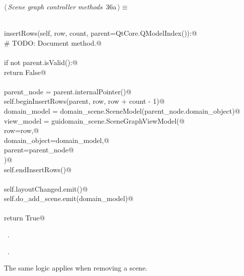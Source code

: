 \documentclass[
    a4paper,      %
    10pt,         %
    openright,    %
    notitlepage,  %
    parskip=half, %
]{scrreprt}       %
\theoremstyle{definition}                    %
\begin{document}
\begin{flushleft} \small
\begin{minipage}{\linewidth}\label{scrap42}\raggedright\small
{} $\langle\,${\itshape Scene graph controller methods}\nobreak\ {\footnotesize {36a}}$\,\rangle\equiv$
\vspace{-1exm}
\begin{list}{}{} \item
\mbox{}\lstinline@@\\
\mbox{}\lstinline@def insertRows(self, row, count, parent=QtCore.QModelIndex()):@\\
\mbox{}\lstinline@    # TODO: Document method.@\\
\mbox{}\lstinline@@\\
\mbox{}\lstinline@    if not parent.isValid():@\\
\mbox{}\lstinline@        return False@\\
\mbox{}\lstinline@@\\
\mbox{}\lstinline@    parent_node = parent.internalPointer()@\\
\mbox{}\lstinline@    self.beginInsertRows(parent, row, row + count - 1)@\\
\mbox{}\lstinline@    domain_model  = domain_scene.SceneModel(parent_node.domain_object)@\\
\mbox{}\lstinline@    view_model = guidomain_scene.SceneGraphViewModel(@\\
\mbox{}\lstinline@        row=row,@\\
\mbox{}\lstinline@        domain_object=domain_model,@\\
\mbox{}\lstinline@        parent=parent_node@\\
\mbox{}\lstinline@    )@\\
\mbox{}\lstinline@    self.endInsertRows()@\\
\mbox{}\lstinline@@\\
\mbox{}\lstinline@    self.layoutChanged.emit()@\\
\mbox{}\lstinline@    self.do_add_scene.emit(domain_model)@\\
\mbox{}\lstinline@@\\
\mbox{}\lstinline@    return True@\\
\mbox{}\lstinline@@{\NWsep}
\end{list}
\vspace{-1.5ex}
\footnotesize
\begin{list}{}{\setlength{\itemsep}{-\parsep}\setlength{\itemindent}{-\leftmargin}}
\item \NWtxtMacroDefBy\ .
\item \NWtxtMacroRefIn\ .

\item{}
\end{list}
\end{minipage}\vspace{4ex}
\end{flushleft}
The same logic applies when removing a scene.
\end{document}
